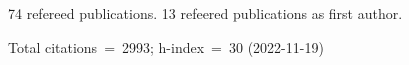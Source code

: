 74 refereed publications. 13 refeered publications as first author.

Total citations~=~2993; h-index~=~30 (2022-11-19)